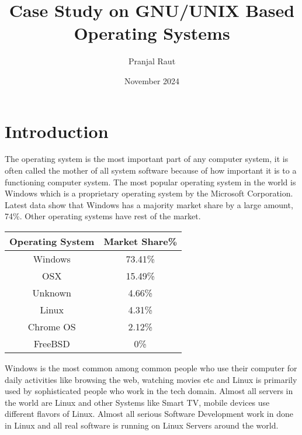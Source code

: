 \documentclass{article}
\title{Case Study on GNU/UNIX Based Operating Systems}
\author{Pranjal Raut}
\date{November 2024}
\begin{document}
\maketitle

\section{Introduction}
The operating system is the most important part of any computer system, it is often called the mother of all system software because of how important it is to a functioning computer system. The most popular operating system in the world is Windows which is a proprietary operating system by the Microsoft Corporation. Latest data show that Windows has a majority market share by a large amount, 74\%. Other operating systems have rest of the market.


\begin{center}
\begin{tabular}{||c c ||} 
 \hline
 Operating System & Market Share\% \\ [0.5ex] 
 \hline\hline
 Windows & 73.41\% \\ 
 \hline
 OSX & 15.49\%  \\
 \hline
 Unknown & 4.66\% \\
 \hline
 Linux & 4.31\%  \\
 \hline
 Chrome OS & 2.12\%  \\ 
 \hline 
 FreeBSD & 0\% \\ [1ex] 
 \hline
\end{tabular}
\end{center}
Windows is the most common among common people who use their computer for daily activities like browsing the web, watching movies etc and Linux is primarily used by sophisticated people who work in the tech domain. Almost all servers in the world are Linux and other Systems like Smart TV, mobile devices use different flavors of Linux. Almost all serious Software Development work in done in Linux and all real software is running on Linux Servers around the world. 
\end{document}
